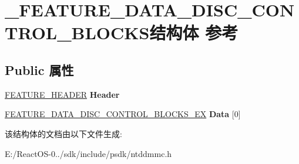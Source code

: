 \hypertarget{struct___f_e_a_t_u_r_e___d_a_t_a___d_i_s_c___c_o_n_t_r_o_l___b_l_o_c_k_s}{}\section{\+\_\+\+F\+E\+A\+T\+U\+R\+E\+\_\+\+D\+A\+T\+A\+\_\+\+D\+I\+S\+C\+\_\+\+C\+O\+N\+T\+R\+O\+L\+\_\+\+B\+L\+O\+C\+K\+S结构体 参考}
\label{struct___f_e_a_t_u_r_e___d_a_t_a___d_i_s_c___c_o_n_t_r_o_l___b_l_o_c_k_s}
\subsection*{Public 属性}
\begin{DoxyCompactItemize}
\item 
\mbox{\label{struct___f_e_a_t_u_r_e___d_a_t_a___d_i_s_c___c_o_n_t_r_o_l___b_l_o_c_k_s_aec179d7ecfff6a840d67df6153c813f2}} 
\hyperlink{struct___f_e_a_t_u_r_e___h_e_a_d_e_r}{F\+E\+A\+T\+U\+R\+E\+\_\+\+H\+E\+A\+D\+ER} {\bfseries Header}
\item 
\mbox{\label{struct___f_e_a_t_u_r_e___d_a_t_a___d_i_s_c___c_o_n_t_r_o_l___b_l_o_c_k_s_a8a364410e247f4ec320d065e76f9054d}} 
\hyperlink{struct___f_e_a_t_u_r_e___d_a_t_a___d_i_s_c___c_o_n_t_r_o_l___b_l_o_c_k_s___e_x}{F\+E\+A\+T\+U\+R\+E\+\_\+\+D\+A\+T\+A\+\_\+\+D\+I\+S\+C\+\_\+\+C\+O\+N\+T\+R\+O\+L\+\_\+\+B\+L\+O\+C\+K\+S\+\_\+\+EX} {\bfseries Data} \mbox{[}0\mbox{]}
\end{DoxyCompactItemize}


该结构体的文档由以下文件生成\+:\begin{DoxyCompactItemize}
\item 
E\+:/\+React\+O\+S-\/0../sdk/include/psdk/ntddmmc.\+h\end{DoxyCompactItemize}
